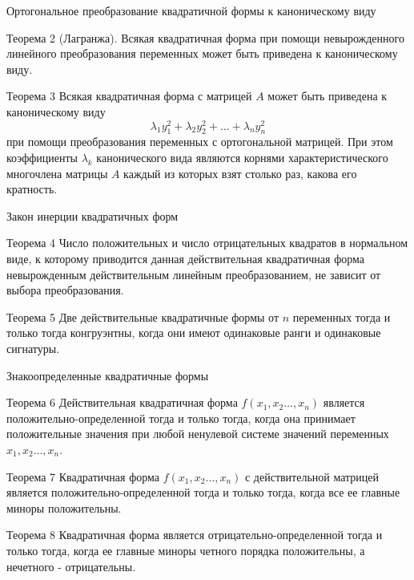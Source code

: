 \documentclass[10pt,pdf,hyperref={unicode}]{beamer}
\begin{document}
\begin{frame}{Ортогональное преобразование квадратичной формы к
каноническому виду}

\begin{block}{Теорема 2 (Лагранжа).} 
Всякая квадратичная форма при помощи невырожденного линейного преобразования переменных может быть приведена к каноническому виду. 
\end{block}


\begin{block}{Теорема 3} 
Всякая квадратичная форма с матрицей $A$ может быть приведена к каноническому виду 
$$ \lambda_1y_1^2+\lambda_2y_2^2+\dots + \lambda_ny_n^2$$
при помощи преобразования переменных с ортогональной матрицей. При этом коэффициенты $ \lambda_k $ канонического вида являются корнями характеристического многочлена матрицы $A$ каждый из которых взят столько раз, какова его кратность. 
\end{block}

\end{frame} 

\begin{frame}{Закон инерции квадратичных форм}

\begin{block}{Теорема 4} 
Число положительных и число отрицательных квадратов в нормальном виде, к которому приводится данная действительная квадратичная форма невырожденным действительным линейным преобразованием, не зависит от выбора преобразования.
\end{block}

\begin{block}{Теорема 5} 
Две действительные квадратичные формы от $n$ переменных тогда и только тогда конгруэнтны, когда они имеют одинаковые ранги и одинаковые сигнатуры.
\end{block}

\end{frame} 

\begin{frame}{Знакоопределенные квадратичные формы}

\begin{block}{Теорема 6} 
Действительная квадратичная форма $f(x_1,x_2…,x_n)$ является положительно-определенной тогда и только тогда, когда она принимает положительные значения при любой ненулевой системе значений переменных $x_1,x_2…,x_n$. 
\end{block}

\begin{block}{Теорема 7} 
Квадратичная форма $f(x_1,x_2…,x_n)$ с действительной матрицей является положительно-определенной тогда и только тогда, когда все ее главные миноры положительны.
\end{block}

\begin{block}{Теорема 8} 
Квадратичная форма является отрицательно-определенной тогда и только тогда, когда ее главные миноры четного порядка положительны, а нечетного - отрицательны.
\end{block}

\end{frame} 
\end{document}
